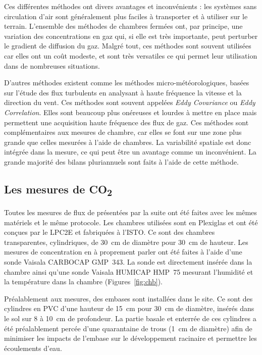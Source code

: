 Ces différentes méthodes ont divers avantages et inconvénients : les systèmes sans circulation d'air sont généralement plus faciles à transporter et à utiliser sur le terrain.
L'ensemble des méthodes de chambres fermées ont, par principe, une variation des concentrations en gaz qui, si elle est très importante, peut perturber le gradient de diffusion du gaz.
Malgré tout, ces méthodes sont souvent utilisées car elles ont un coût modeste, et sont très versatiles ce qui permet leur utilisation dans de nombreuses situations.

D'autres méthodes existent comme les méthodes micro-météorologiques, basées sur l'étude des flux turbulents en analysant à haute fréquence la vitesse et la direction du vent.
Ces méthodes sont souvent appelées \textit{Eddy Covariance} ou \textit{Eddy Correlation}.
Elles sont beaucoup plus onéreuses et lourdes à mettre en place mais permettent une acquisition haute fréquence des flux de gaz.
Ces méthodes sont complémentaires aux mesures de chambre, car elles se font sur une zone plus grande que celles mesurées à l'aide de chambres.
La variabilité spatiale est donc intégrée dans la mesure, ce qui peut être un avantage comme un inconvénient.
La grande majorité des bilans pluriannuels sont faits à l'aide de cette méthode.

\subsection{Les mesures de \texorpdfstring{CO\textsubscript{2}}{CO2}}
\label{subsec:ss_mes_co2}

Toutes les mesures de flux de \coo présentées par la suite ont été faites avec les mêmes matériels et le même protocole.
Les chambres utilisées sont en Plexiglas\textsuperscript{\textregistered} et ont été conçues par le LPC2E et fabriquées à l'ISTO.
Ce sont des chambres transparentes, cylindriques, de \SI{30}{\centi\metre} de diamètre pour \SI{30}{\centi\metre} de hauteur.
Les mesures de concentration en \coo à proprement parler ont été faites à l'aide d'une sonde Vaisala CARBOCAP\textsuperscript{\textregistered} GMP~343.
La sonde est directement insérée dans la chambre ainsi qu'une sonde Vaisala HUMICAP\textsuperscript{\textregistered} HMP~75 mesurant l'humidité et la température dans la chambre (Figures~\ref{fig:chb}).

Préalablement aux mesures, des embases sont installées dans le site.
Ce sont des cylindres en PVC d'une hauteur de \SI{15}{\centi\metre} pour \SI{30}{\centi\metre} de diamètre, insérés dans le sol sur 8 à \SI{10}{\centi\metre} de profondeur.
La partie basale et enterrée de ces cylindres a été préalablement percée d'une quarantaine de trous (\SI{1}{\centi\metre} de diamètre) afin de minimiser les impacts de l'embase sur le développement racinaire et permettre les écoulements d'eau.

